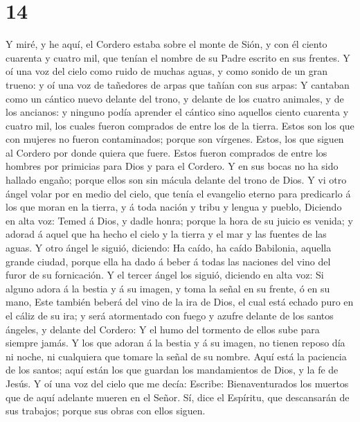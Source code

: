 \hypertarget{section-13}{%
\section{14}\label{section-13}}

 Y miré, y he aquí, el Cordero estaba sobre el monte de
Sión, y con él ciento cuarenta y cuatro mil, que tenían el nombre de su
Padre escrito en sus frentes.  Y oí una voz del cielo como
ruido de muchas aguas, y como sonido de un gran trueno: y oí una voz de
tañedores de arpas que tañían con sus arpas:  Y cantaban
como un cántico nuevo delante del trono, y delante de los cuatro
animales, y de los ancianos: y ninguno podía aprender el cántico sino
aquellos ciento cuarenta y cuatro mil, los cuales fueron comprados de
entre los de la tierra.  Estos son los que con mujeres no
fueron contaminados; porque son vírgenes. Estos, los que siguen al
Cordero por donde quiera que fuere. Estos fueron comprados de entre los
hombres por primicias para Dios y para el Cordero.  Y en sus
bocas no ha sido hallado engaño; porque ellos son sin mácula delante del
trono de Dios.  Y vi otro ángel volar por en medio del
cielo, que tenía el evangelio eterno para predicarlo á los que moran en
la tierra, y á toda nación y tribu y lengua y pueblo, 
Diciendo en alta voz: Temed á Dios, y dadle honra; porque la hora de su
juicio es venida; y adorad á aquel que ha hecho el cielo y la tierra y
el mar y las fuentes de las aguas.  Y otro ángel le siguió,
diciendo: Ha caído, ha caído Babilonia, aquella grande ciudad, porque
ella ha dado á beber á todas las naciones del vino del furor de su
fornicación.  Y el tercer ángel los siguió, diciendo en alta
voz: Si alguno adora á la bestia y á su imagen, y toma la señal en su
frente, ó en su mano,  Este también beberá del vino de la
ira de Dios, el cual está echado puro en el cáliz de su ira; y será
atormentado con fuego y azufre delante de los santos ángeles, y delante
del Cordero:  Y el humo del tormento de ellos sube para
siempre jamás. Y los que adoran á la bestia y á su imagen, no tienen
reposo día ni noche, ni cualquiera que tomare la señal de su nombre.
 Aquí está la paciencia de los santos; aquí están los que
guardan los mandamientos de Dios, y la fe de Jesús.  Y oí
una voz del cielo que me decía: Escribe: Bienaventurados los muertos que
de aquí adelante mueren en el Señor. Sí, dice el Espíritu, que
descansarán de sus trabajos; porque sus obras con ellos siguen.
